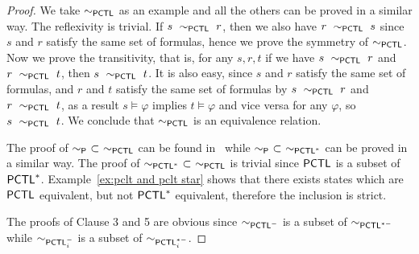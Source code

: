 \documentclass{LMCS}
\def\phi{\varphi}
\newcommand{\BSP}{\ensuremath{\sim_{{\sf P}}}}
\newcommand{\PCTL}{{\sf PCTL}}
\newcommand{\PCTLS}{{\sf PCTL}^{*}}
\newcommand{\EPCTL}{\sim_{\PCTL}}
\newcommand{\EPCTLM}{\sim_{\PCTL^{-}}}
\newcommand{\iEPCTLM}[1]{\sim_{\PCTL^{-}_{#1}}}
\newcommand{\EPCTLS}{\sim_{\PCTL^{*}}}
\newcommand{\EPCTLSM}{\sim_{\PCTL^{*-}}}
\newcommand{\iEPCTLSM}[1]{\sim_{\PCTL_{#1}^{*-}}}
\begin{document}
\begin{proof}
We take $\EPCTL$ as an example and all the others can be proved in a similar way. The reflexivity is trivial. If $s~\EPCTL~r$, then we also have $r~\EPCTL~s$ since $s$ and $r$ satisfy the same set of formulas, hence we prove the symmetry of $\EPCTL$. Now we prove the transitivity, that is, for any $s,r,t$ if we have $s~\EPCTL~r$ and $r~\EPCTL~t$, then $s~\EPCTL~t$. It is also easy, since $s$ and $r$ satisfy the same set of formulas, and $r$ and $t$ satisfy the same set of formulas by $s~\EPCTL~r$ and $r~\EPCTL~t$, as a result $s\models\phi$ implies $t\models\phi$ and vice versa for any $\phi$, so $s~\EPCTL~t$. We conclude that $\EPCTL$ is an equivalence relation.

The proof of $\BSP~\subset~\EPCTL$ can be found in~\cite{SegalaL95} while $\BSP~\subset~\EPCTLS$ can be proved in a similar way.
The proof of $\EPCTLS~\subset~\EPCTL$ is trivial since $\PCTL$ is a subset of $\PCTL^{*}$. Example~\ref{ex:pclt and pclt star} shows that there exists
states which are $\PCTL$ equivalent, but not $\PCTLS$ equivalent, therefore
the inclusion is strict.

The proofs of Clause 3 and 5 are obvious since $\EPCTLM$ is a subset of $\EPCTLSM$ while $\iEPCTLM{i}$ is a subset of $\iEPCTLSM{i}$.


\end{proof}
\end{document}
